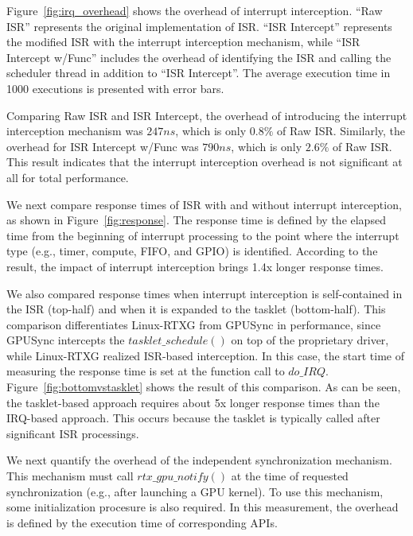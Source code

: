 Figure~\ref{fig:irq_overhead} shows the overhead of interrupt interception.
``Raw ISR'' represents the original implementation of ISR.
``ISR Intercept'' represents the modified ISR with the interrupt
interception mechanism, while ``ISR Intercept w/Func'' includes the
overhead of identifying the ISR and calling the scheduler thread in
addition to ``ISR Intercept''.
The average execution time in 1000 executions is presented with error
bars.

Comparing Raw ISR and ISR Intercept, the overhead of introducing the
interrupt interception mechanism was $247ns$, which is only $0.8\%$ of
Raw ISR.
Similarly, the overhead for ISR Intercept w/Func was $790ns$, which is
only $2.6\%$ of Raw ISR.
This result indicates that the interrupt interception overhead is not
significant at all for total performance.

We next compare response times of ISR with and without interrupt
interception, as shown in Figure~\ref{fig:response}.
The response time is defined by the elapsed time from the beginning of
interrupt processing to the point where the interrupt type (e.g., timer,
compute, FIFO, and GPIO) is identified. 
According to the result, the impact of interrupt interception brings
1.4x longer response times.

We also compared response times when interrupt interception is
self-contained in the ISR (top-half) and when it is expanded to the
tasklet (bottom-half).
This comparison differentiates Linux-RTXG from GPUSync in performance,
since GPUSync intercepts the $tasklet\_schedule()$ on top of the
proprietary driver, while Linux-RTXG realized ISR-based interception.
In this case, the start time of measuring the response time is set at
the function call to $do\_IRQ$.
Figure~\ref{fig:bottomvstasklet} shows the result of this comparison.
As can be seen, the tasklet-based approach requires about 5x longer
response times than the IRQ-based approach.
This occurs because the tasklet is typically called after significant
ISR processings.

We next quantify the overhead of the independent synchronization
mechanism.
This mechanism must call $rtx\_gpu\_notify()$ at the time of requested
synchronization (e.g., after launching a GPU kernel).
To use this mechanism, some initialization procesure is also required.
In this measurement, the overhead is defined by the execution time of
corresponding APIs.

